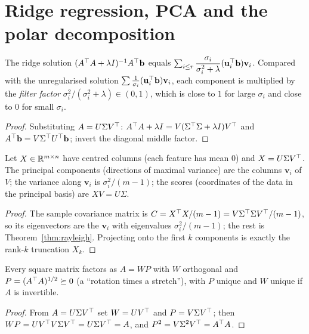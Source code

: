 \section{Ridge regression, PCA and the polar decomposition}

\begin{proposition}\label{prop:ridgesvd}
The ridge solution $(A^{\top} A+\lambda I)^{-1}A^{\top}\mathbf{b}$ equals $\sum_{i\le r}\dfrac{\sigma_i}{\sigma_i^2+\lambda}(\mathbf{u}_i^{\top}\mathbf{b})\mathbf{v}_i$. Compared with the unregularised solution $\sum\frac1{\sigma_i}(\mathbf{u}_i^{\top}\mathbf{b})\mathbf{v}_i$, each component is multiplied by the \emph{filter factor} $\sigma_i^2/(\sigma_i^2+\lambda)\in(0,1)$, which is close to $1$ for large $\sigma_i$ and close to $0$ for small $\sigma_i$.
\end{proposition}

\begin{proof}
Substituting $A=U\Sigma V^{\top}$: $A^{\top} A+\lambda I=V(\Sigma^{\top}\Sigma+\lambda I)V^{\top}$ and $A^{\top}\mathbf{b}=V\Sigma^{\top} U^{\top}\mathbf{b}$; invert the diagonal middle factor.
\end{proof}

\begin{theorem}\label{thm:pca}
Let $X\in\mathbb{R}^{m\times n}$ have centred columns (each feature has mean $0$) and $X=U\Sigma V^{\top}$. The principal components (directions of maximal variance) are the columns $\mathbf{v}_i$ of $V$; the variance along $\mathbf{v}_i$ is $\sigma_i^2/(m-1)$; the scores (coordinates of the data in the principal basis) are $XV=U\Sigma$.
\end{theorem}

\begin{proof}
The sample covariance matrix is $C=X^{\top} X/(m-1)=V\Sigma^{\top}\Sigma V^{\top}/(m-1)$, so its eigenvectors are the $\mathbf{v}_i$ with eigenvalues $\sigma_i^2/(m-1)$; the rest is Theorem~\ref{thm:rayleigh}. Projecting onto the first $k$ components is exactly the rank-$k$ truncation $X_k$.
\end{proof}

\begin{theorem}\label{thm:polar}
Every square matrix factors as $A=WP$ with $W$ orthogonal and $P=(A^{\top} A)^{1/2}\succeq0$ (a ``rotation times a stretch''), with $P$ unique and $W$ unique if $A$ is invertible.
\end{theorem}

\begin{proof}
From $A=U\Sigma V^{\top}$ set $W=UV^{\top}$ and $P=V\Sigma V^{\top}$; then $WP=UV^{\top} V\Sigma V^{\top}=U\Sigma V^{\top}=A$, and $P^2=V\Sigma^2V^{\top}=A^{\top} A$.
\end{proof}

